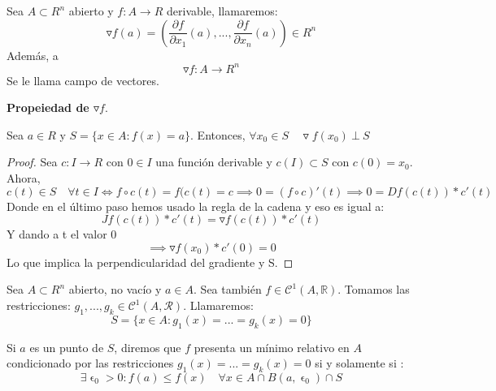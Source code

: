 \begin{ndef}[Gradiente]
	Sea $A\subset R^n$ abierto y $f:A\to R$ derivable, llamaremos:
	\[
	\triangledown f(a) = (\frac{\partial f}{\partial x_1}(a),...,\frac{\partial f}{\partial x_n}(a))\in R^n
	\]
	Además, a
	\[
	\triangledown f: A \to R^n
	\]
	Se le llama campo de vectores.
	\end{ndef}

\textbf{Propeiedad de $\triangledown f$}.

Sea $a \in R$ y $S =\{x \in A :f(x) = a\}$. Entonces, $\forall x_0 \in S \quad \triangledown f(x_0) \  \bot \ S$
\begin{proof}
	Sea $c : I \to R$ con $0 \in I$ una función derivable y $c(I)\subset S$ con $c(0)=x_0$. Ahora,
	\[
	c(t) \in S \quad \forall t \in I \iff f\circ c(t) = f(c(t) = c \implies 0 = (f\circ c)'(t) \implies 0 = Df(c(t))*c'(t)
	\]
	Donde en el último paso hemos usado la regla de la cadena y eso es igual a:
	\[
	Jf(c(t))*c'(t)= \triangledown f(c(t))*c'(t)
	\]
	Y dando a t el valor 0
	\[
	\implies \triangledown f(x_0)*c'(0) = 0
	\]
	Lo que implica la perpendicularidad del gradiente y S.
\end{proof}


\begin{ndef}
	Sea $A\subset R^n$ abierto, no vacío y $a\in A$. Sea también $f\in \mathcal{C}^1(A,\mathbb{R})$. Tomamos las restricciones: $g_1,...,g_k \in \mathcal{C}^1(A,\mathcal{R})$.
	Llamaremos:
	\[
	S=\{ x\in A:g_1(x)=...=g_k(x) = 0\}
	\]

\end{ndef}



\begin{ndef}
	Si $a$ es un punto de $S$, diremos que $f$ presenta un mínimo relativo en $A$ condicionado por las restricciones $g_1(x)=...=g_k(x) = 0$ si y solamente si :
	\[
	\exists \upvarepsilon_0 > 0 : f(a) \leq f(x) \quad \forall x \in A\cap B(a,\upvarepsilon_0) \cap S
	\]
\end{ndef}



